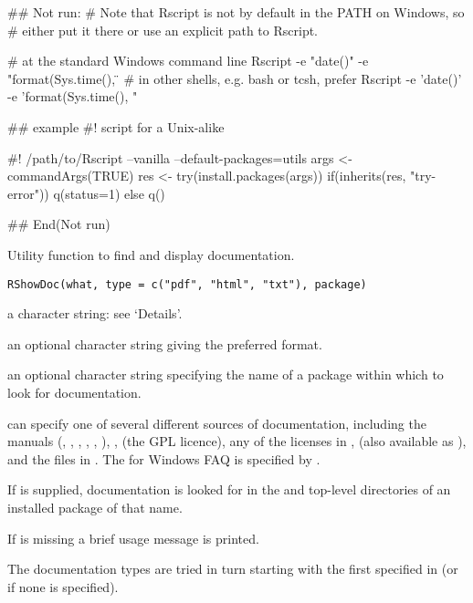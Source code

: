 \begin{Examples}
\begin{ExampleCode}
## Not run: 
# Note that Rscript is not by default in the PATH on Windows, so
# either put it there or use an explicit path to Rscript.

# at the standard Windows command line
Rscript -e "date()" -e "format(Sys.time(), \"%
# in other shells, e.g. bash or tcsh, prefer
Rscript -e 'date()' -e 'format(Sys.time(), "%

## example #! script for a Unix-alike

#! /path/to/Rscript --vanilla --default-packages=utils
args <- commandArgs(TRUE)
res <- try(install.packages(args))
if(inherits(res, "try-error")) q(status=1) else q()


## End(Not run)
\end{ExampleCode}
\end{Examples}
%
\begin{Description}\relax
Utility function to find and display \R{} documentation.
\end{Description}
%
\begin{Usage}
\begin{verbatim}
RShowDoc(what, type = c("pdf", "html", "txt"), package)
\end{verbatim}
\end{Usage}
%
\begin{Arguments}
\begin{ldescription}
\item[\code{what}] a character string: see `Details'.
\item[\code{type}] an optional character string giving the preferred format.
\item[\code{package}] an optional character string specifying the name of a
package within which to look for documentation.
\end{ldescription}
\end{Arguments}
%
\begin{Details}\relax
{} can specify one of several different sources of documentation,
including the \R{} manuals (, , ,
, , ), ,
 (the GPL licence), any of the licenses in
,  (also available as
), and the files in .
The \R{} for Windows FAQ is specified by .

If  is supplied, documentation is looked for in the
 and top-level directories of an installed package of that name.

If  is missing a brief usage message is printed.

The documentation types are tried in turn starting with the first
specified in  (or  if none is specified).
\end{Details}

